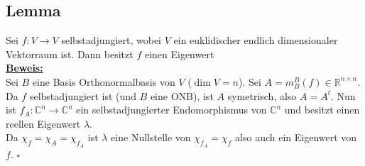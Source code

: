 \subsection{Lemma} %
\label{sub:lemma}
Sei $f : V \to V$ selbstadjungiert, wobei $V$ ein euklidischer endlich dimensionaler Vektorraum ist. Dann besitzt $f$ einen Eigenwert
\vspace{10pt} \\
\underline{\textbf{Beweis:}} \\
Sei $B$ eine Basis Orthonormalbasis von $V$ ($\dim V = n$). Sei $A= m_B^B (f) \in \mathds{R}^{n \times n}$. Da $f$ selbstadjungiert ist (und $B$ eine ONB), ist
$A$ symetrisch, also $A= A^t$. Nun ist $f_A : \mathds{C}^n \to \mathds{C}^n$ ein selbstadjungierter Endomorphismus von $\mathds{C}^n$ und besitzt einen reellen 
Eigenwert $\lambda$. \\
Da $\chi_f = \chi_A = \chi_{f_A}$ ist $\lambda$ eine Nullstelle von $\chi_{f_A}=\chi_f$ also auch ein Eigenwert von $f$. \hfill \( \square \)


\cleardoubleoddemptypage
{}
\setcounter{page}{1}
\printindex
\listoffigures
